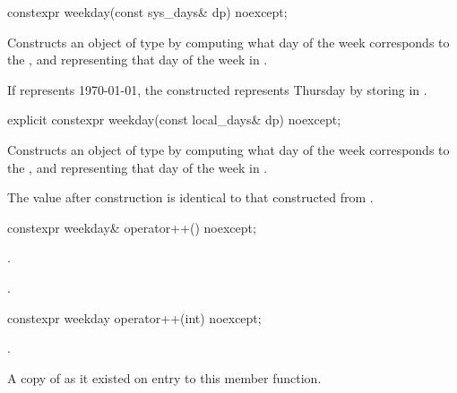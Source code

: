 %
\begin{itemdecl}
constexpr weekday(const sys_days& dp) noexcept;
\end{itemdecl}

\begin{itemdescr}
\pnum
\effects
Constructs an object of type  by
computing what day of the week corresponds to the  ,
and representing that day of the week in .

\pnum
\begin{example}
If  represents 1970-01-01,
the constructed  represents Thursday
by storing  in .
\end{example}
\end{itemdescr}

%
\begin{itemdecl}
explicit constexpr weekday(const local_days& dp) noexcept;
\end{itemdecl}

\begin{itemdescr}
\pnum
\effects
Constructs an object of type  by
computing what day of the week corresponds to the  ,
and representing that day of the week in .

\pnum
\remarks
The value after construction is identical to that constructed from
.
\end{itemdescr}

%
\begin{itemdecl}
constexpr weekday& operator++() noexcept;
\end{itemdecl}

\begin{itemdescr}
\pnum
\effects {}.

\pnum
\returns {}.
\end{itemdescr}

%
\begin{itemdecl}
constexpr weekday operator++(int) noexcept;
\end{itemdecl}

\begin{itemdescr}
\pnum
\effects {}.

\pnum
\returns A copy of  as it existed on entry to this member function.
\end{itemdescr}

